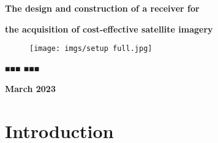 \documentclass{article}
\begin{document}
\centerline{\textbf{{\huge The design and construction of a receiver for }}}
\centerline{\textbf{{\huge the acquisition of cost-effective satellite imagery}}}


\begin{figure}[H]
    \centering
    \texttt{[image: imgs/setup full.jpg]}
    \label{freq band image}
\end{figure}

\centerline{\textbf{{\Large ■■■ ■■■}}}

\centerline{\textbf{{\Large March 2023}}}

\newpage

\tableofcontents

\newpage


\section{Introduction}
\end{document}
